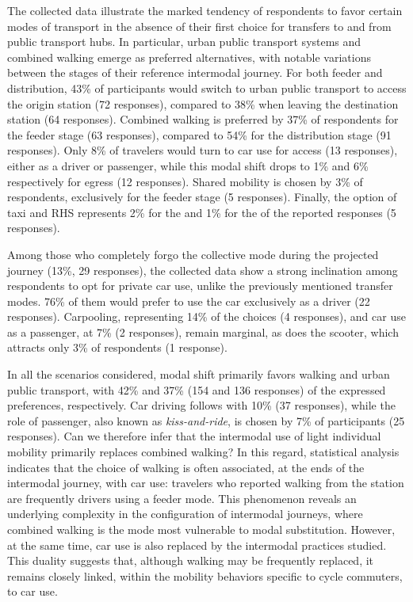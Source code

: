 \begin{refsegment}
The collected data illustrate the marked tendency of respondents to favor certain modes of transport in the absence of their first choice for transfers to and from public transport hubs. In particular, urban public transport systems and combined walking emerge as preferred alternatives, with notable variations between the stages of their reference intermodal journey. For both feeder and distribution, 43\% of participants would switch to urban public transport to access the origin station (72 responses), compared to 38\% when leaving the destination station (64 responses). Combined walking is preferred by 37\% of respondents for the feeder stage (63 responses), compared to 54\% for the distribution stage (91 responses). Only 8\% of travelers would turn to car use for access (13 responses), either as a driver or passenger, while this modal shift drops to 1\% and 6\% respectively for egress (12 responses). Shared mobility is chosen by 3\% of respondents, exclusively for the feeder stage (5 responses). Finally, the option of taxi and \acrfull{RHS} represents 2\% for the  and 1\% for the  of the reported responses (5 responses). %

Among those who completely forgo the collective mode during the projected journey (13\%, 29 responses), the collected data show a strong inclination among respondents to opt for private car use, unlike the previously mentioned transfer modes. 76\% of them would prefer to use the car exclusively as a driver (22 responses). Carpooling, representing 14\% of the choices (4 responses), and car use as a passenger, at 7\% (2 responses), remain marginal, as does the scooter, which attracts only 3\% of respondents (1 response). %

In all the scenarios considered, modal shift primarily favors walking and urban public transport, with 42\% and 37\% (154 and 136 responses) of the expressed preferences, respectively. Car driving follows with 10\% (37 responses), while the role of passenger, also known as \textsl{kiss-and-ride}, is chosen by 7\% of participants (25 responses). Can we therefore infer that the intermodal use of light individual mobility primarily replaces combined walking? In this regard, statistical analysis indicates that the choice of walking is often associated, at the ends of the intermodal journey, with car use: travelers who reported walking from the station are frequently drivers using a feeder mode. This phenomenon reveals an underlying complexity in the configuration of intermodal journeys, where combined walking is the mode most vulnerable to modal substitution. However, at the same time, car use is also replaced by the intermodal practices studied. This duality suggests that, although walking may be frequently replaced, it remains closely linked, within the mobility behaviors specific to cycle commuters, to car use. %


\end{refsegment}
